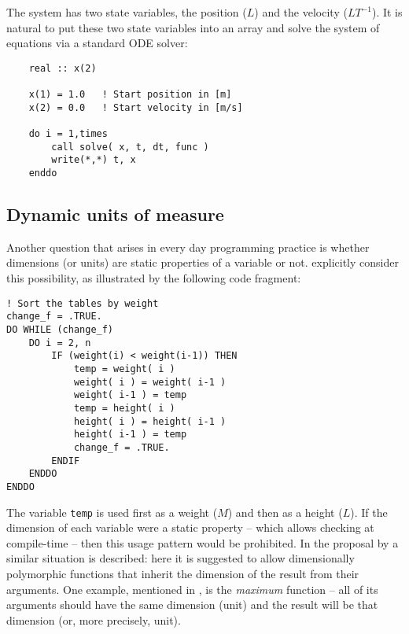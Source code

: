 \documentclass{article}
\begin{document}
The system has two state variables, the position ($L$) and the velocity ($L T^{-1}$). It is natural to put these two
state variables into an array and solve the system of equations via a standard ODE solver:
\begin{verbatim}
    real :: x(2)

    x(1) = 1.0   ! Start position in [m]
    x(2) = 0.0   ! Start velocity in [m/s]

    do i = 1,times
        call solve( x, t, dt, func )
        write(*,*) t, x
    enddo
\end{verbatim}

\subsection*{Dynamic units of measure}
Another question that arises in every day programming practice is whether dimensions (or units) are static properties
of a variable or not. \cite{FPTSymbolLives} explicitly consider this possibility, as illustrated by the following
code fragment:

\begin{verbatim}
! Sort the tables by weight
change_f = .TRUE.
DO WHILE (change_f)
    DO i = 2, n
        IF (weight(i) < weight(i-1)) THEN
            temp = weight( i )
            weight( i ) = weight( i-1 )
            weight( i-1 ) = temp
            temp = height( i )
            height( i ) = height( i-1 )
            height( i-1 ) = temp
            change_f = .TRUE.
        ENDIF
    ENDDO
ENDDO
\end{verbatim}

The variable \verb+temp+ is used first as a weight ($M$) and then as a height ($L$). If the dimension of each variable were
a static property -- which allows checking at compile-time -- then this usage pattern would be prohibited. In the proposal
by \cite{PhysicalEngineeringUnitsN2113} a similar situation is described: here it is suggested to allow dimensionally polymorphic
functions that inherit the dimension of the result from their arguments. One example, mentioned in \cite{SimConFPTCheckingUnits},
is the \emph{maximum} function -- all of its arguments should have the same dimension (unit) and the result will be that dimension
(or, more precisely, unit).
\end{document}
